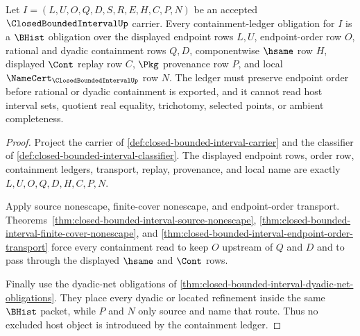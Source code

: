 \begin{theorem}
\label{thm:closed-bounded-interval-containment-ledger-obligations}
Let $I=(L,U,O,Q,D,S,R,E,H,C,P,N)$ be an accepted $\ClosedBoundedIntervalUp$ carrier. Every containment-ledger obligation for $I$ is a $\BHist$ obligation over the displayed endpoint rows $L,U$, endpoint-order row $O$, rational and dyadic containment rows $Q,D$, componentwise $\hsame$ row $H$, displayed $\Cont$ replay row $C$, $\Pkg$ provenance row $P$, and local $\NameCert_{\ClosedBoundedIntervalUp}$ row $N$. The ledger must preserve endpoint order before rational or dyadic containment is exported, and it cannot read host interval sets, quotient real equality, trichotomy, selected points, or ambient completeness.
\end{theorem}
\begin{proof}
Project the carrier of \autoref{def:closed-bounded-interval-carrier} and the classifier of \autoref{def:closed-bounded-interval-classifier}. The displayed endpoint rows, order row, containment ledgers, transport, replay, provenance, and local name are exactly $L,U,O,Q,D,H,C,P,N$.

Apply source nonescape, finite-cover nonescape, and endpoint-order transport. Theorems~\ref{thm:closed-bounded-interval-source-nonescape}, \ref{thm:closed-bounded-interval-finite-cover-nonescape}, and \ref{thm:closed-bounded-interval-endpoint-order-transport} force every containment read to keep $O$ upstream of $Q$ and $D$ and to pass through the displayed $\hsame$ and $\Cont$ rows.

Finally use the dyadic-net obligations of \autoref{thm:closed-bounded-interval-dyadic-net-obligations}. They place every dyadic or located refinement inside the same $\BHist$ packet, while $P$ and $N$ only source and name that route. Thus no excluded host object is introduced by the containment ledger.
\end{proof}

